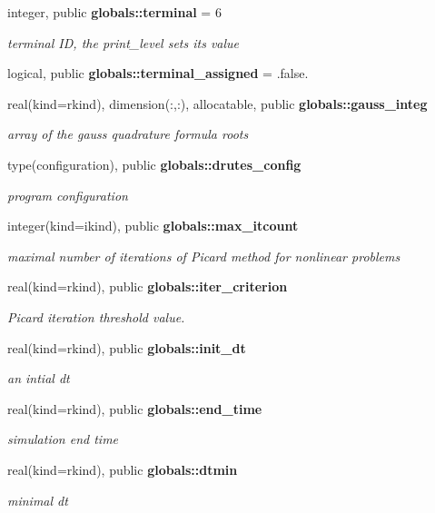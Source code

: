 \begin{DoxyCompactItemize}
integer, public {\bf globals\+::terminal} = 6
\begin{DoxyCompactList}\small\item\em terminal ID, the print\+\_\+level sets its value \end{DoxyCompactList}\item 
logical, public {\bf globals\+::terminal\+\_\+assigned} = .false.
\item 
real(kind=rkind), dimension(\+:,\+:), allocatable, public {\bf globals\+::gauss\+\_\+integ}
\begin{DoxyCompactList}\small\item\em array of the gauss quadrature formula roots \end{DoxyCompactList}\item 
type(configuration), public {\bf globals\+::drutes\+\_\+config}
\begin{DoxyCompactList}\small\item\em program configuration \end{DoxyCompactList}\item 
integer(kind=ikind), public {\bf globals\+::max\+\_\+itcount}
\begin{DoxyCompactList}\small\item\em maximal number of iterations of Picard method for nonlinear problems \end{DoxyCompactList}\item 
real(kind=rkind), public {\bf globals\+::iter\+\_\+criterion}
\begin{DoxyCompactList}\small\item\em Picard iteration threshold value. \end{DoxyCompactList}\item 
real(kind=rkind), public {\bf globals\+::init\+\_\+dt}
\begin{DoxyCompactList}\small\item\em an intial dt \end{DoxyCompactList}\item 
real(kind=rkind), public {\bf globals\+::end\+\_\+time}
\begin{DoxyCompactList}\small\item\em simulation end time \end{DoxyCompactList}\item 
real(kind=rkind), public {\bf globals\+::dtmin}
\begin{DoxyCompactList}\small\item\em minimal dt \end{DoxyCompactList}\item 

\end{DoxyCompactItemize}
